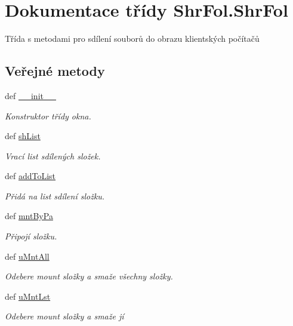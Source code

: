 \hypertarget{classShrFol_1_1ShrFol}{\section{Dokumentace třídy Shr\-Fol.\-Shr\-Fol}
\label{d1/dce/classShrFol_1_1ShrFol}
}


Třída s metodami pro sdílení souborů do obrazu klientských počítačů  


\subsection*{Veřejné metody}
\begin{DoxyCompactItemize}
\item 
def \hyperlink{classShrFol_1_1ShrFol_aab76b87908cebac7e15bed64b47ebf73}{\-\_\-\-\_\-init\-\_\-\-\_\-}
\begin{DoxyCompactList}\small\item\em Konstruktor třídy okna. \end{DoxyCompactList}\item 
def \hyperlink{classShrFol_1_1ShrFol_a9c6d9419ead704adaa83dd00209f7d8d}{sh\-List}
\begin{DoxyCompactList}\small\item\em Vrací list sdílených složek. \end{DoxyCompactList}\item 
def \hyperlink{classShrFol_1_1ShrFol_a9f817cf66c0e30b0f6f7fe8dc56ca7da}{add\-To\-List}
\begin{DoxyCompactList}\small\item\em Přidá na list sdílení složku. \end{DoxyCompactList}\item 
def \hyperlink{classShrFol_1_1ShrFol_a4ae98f7c19faad255bf500c442578a45}{mnt\-By\-Pa}
\begin{DoxyCompactList}\small\item\em Připojí složku. \end{DoxyCompactList}\item 
def \hyperlink{classShrFol_1_1ShrFol_a83073341f2ff8ba2cc2f0ec3d28f0bfe}{u\-Mnt\-All}
\begin{DoxyCompactList}\small\item\em Odebere mount složky a smaže všechny složky. \end{DoxyCompactList}\item 
def \hyperlink{classShrFol_1_1ShrFol_a09764ae9bb636491c06f49b382d96632}{u\-Mnt\-Lst}
\begin{DoxyCompactList}\small\item\em Odebere mount složky a smaže jí \end{DoxyCompactList}\item 

\end{DoxyCompactItemize}

